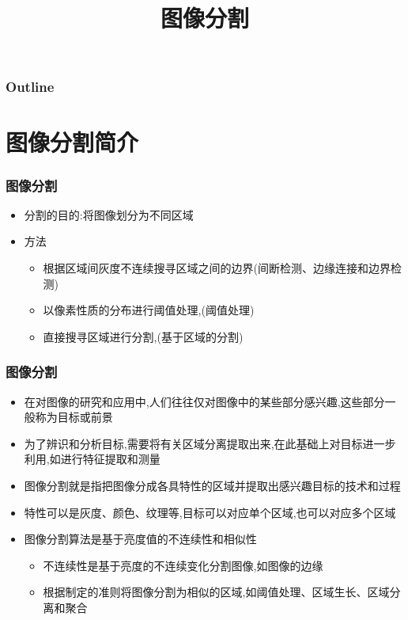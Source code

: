 \documentclass{beamer}
\title{图像分割}
\author{}
\date{}
\begin{document}
\maketitle

\begin{frame}
\frametitle{Outline}
\setcounter{tocdepth}{3}
\tableofcontents
\end{frame}













\section{图像分割简介}
\label{sec-1}
\begin{frame}
\frametitle{图像分割}
\label{sec-1-1}

\begin{itemize}
\item 分割的目的:将图像划分为不同区域
\item 方法
\begin{itemize}
\item 根据区域间灰度不连续搜寻区域之间的边界(间断检测、边缘连接和边界检测)
\item 以像素性质的分布进行阈值处理,(阈值处理)
\item 直接搜寻区域进行分割,(基于区域的分割)
\end{itemize}
\end{itemize}
\end{frame}
\begin{frame}
\frametitle{图像分割}
\label{sec-1-2}

\begin{itemize}
\item 在对图像的研究和应用中,人们往往仅对图像中的某些部分感兴趣,这些部分一般称为目标或前景
\item 为了辨识和分析目标,需要将有关区域分离提取出来,在此基础上对目标进一步利用,如进行特征提取和测量
\item 图像分割就是指把图像分成各具特性的区域并提取出感兴趣目标的技术和过程
\item 特性可以是灰度、颜色、纹理等,目标可以对应单个区域,也可以对应多个区域
\item 图像分割算法是基于亮度值的不连续性和相似性
\begin{itemize}
\item 不连续性是基于亮度的不连续变化分割图像,如图像的边缘
\item 根据制定的准则将图像分割为相似的区域,如阈值处理、区域生长、区域分离和聚合
\end{itemize}
\end{itemize}
\end{frame}
\end{document}
